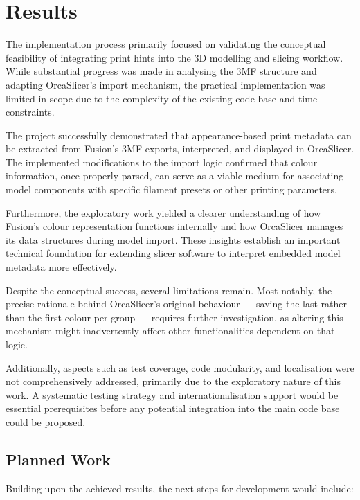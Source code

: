\chapter{Results}\label{ch:results}

The implementation process primarily focused on validating the conceptual feasibility of integrating print hints into the 3D modelling and slicing workflow. 
While substantial progress was made in analysing the 3MF structure and adapting OrcaSlicer’s import mechanism, the practical implementation was limited in scope due to the complexity of the existing code base and time constraints.

The project successfully demonstrated that appearance-based print metadata can be extracted from Fusion's 3MF exports, interpreted, and displayed in OrcaSlicer. 
The implemented modifications to the import logic confirmed that colour information, once properly parsed, can serve as a viable medium for associating model components with specific filament presets or other printing parameters.

Furthermore, the exploratory work yielded a clearer understanding of how Fusion’s colour representation functions internally and how OrcaSlicer manages its data structures during model import. 
These insights establish an important technical foundation for extending slicer software to interpret embedded model metadata more effectively.

Despite the conceptual success, several limitations remain. 
Most notably, the precise rationale behind OrcaSlicer’s original behaviour — saving the last rather than the first colour per group — requires further investigation, as altering this mechanism might inadvertently affect other functionalities dependent on that logic.

Additionally, aspects such as test coverage, code modularity, and localisation were not comprehensively addressed, primarily due to the exploratory nature of this work. 
A systematic testing strategy and internationalisation support would be essential prerequisites before any potential integration into the main code base could be proposed.

\section{Planned Work}

Building upon the achieved results, the next steps for development would include:

